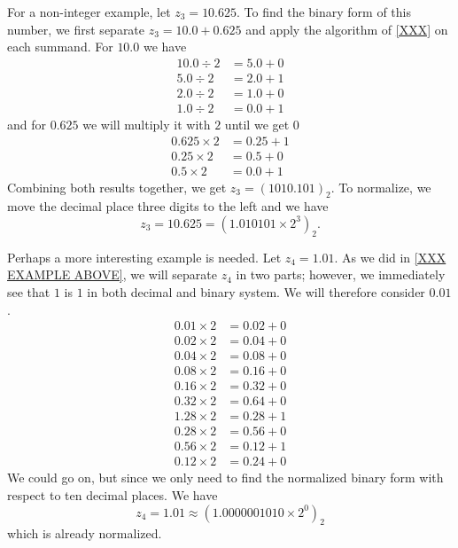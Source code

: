 \begin{exmp}
    For a non-integer example, let \(z_3 = 10.625\). To find the binary form of this number, we first separate \(z_3 = 10.0 + 0.625\) and apply the algorithm of \ref{XXX} on each summand. For \(10.0\) we have
    \begin{align*}
        10.0 \div 2 &= 5.0 + 0 \\
        5.0 \div 2 &= 2.0 + 1 \\
        2.0 \div 2 &= 1.0 + 0 \\
        1.0 \div 2 &= 0.0 + 1
    \end{align*}
    and for \(0.625\) we will multiply it with \(2\) until we get \(0\)
    \begin{align*}
        0.625 \times 2 &= 0.25 + 1 \\
        0.25 \times 2 &= 0.5 + 0 \\
        0.5 \times 2 &= 0.0 + 1
    \end{align*}
    Combining both results together, we get \(z_3 = (1010.101)_2\). To normalize, we move the decimal place three digits to the left and we have
    \begin{equation*}
        z_3 = 10.625 = (1.010101 \times 2^3)_2 \text{.}
    \end{equation*}
\end{exmp}
\begin{exmp}
    Perhaps a more interesting example is needed. Let \(z_4 = 1.01\). As we did in \ref{XXX EXAMPLE ABOVE}, we will separate \(z_4\) in two parts; however, we immediately see that \(1\) is \(1\) in both decimal and binary system. We will therefore consider \(0.01\).
    \begin{align*}
        0.01 \times 2 &= 0.02 + 0 \\
        0.02 \times 2 &= 0.04 + 0 \\
        0.04 \times 2 &= 0.08 + 0 \\
        0.08 \times 2 &= 0.16 + 0 \\
        0.16 \times 2 &= 0.32 + 0 \\
        0.32 \times 2 &= 0.64 + 0 \\
        1.28 \times 2 &= 0.28 + 1 \\
        0.28 \times 2 &= 0.56 + 0 \\
        0.56 \times 2 &= 0.12 + 1 \\
        0.12 \times 2 &= 0.24 + 0
    \end{align*}
    We could go on, but since we only need to find the normalized binary form with respect to ten decimal places. We have
    \begin{equation*}
        z_4 = 1.01 \approx (1.0000001010 \times 2^0)_2
    \end{equation*}
    which is already normalized.
\end{exmp}
